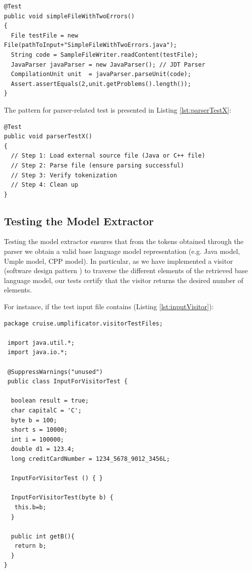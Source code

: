 \begin{lstlisting}[style=java, label={lst:simpleFileWithTwoErrors}, caption=A Parser Test]
@Test
public void simpleFileWithTwoErrors()
{
  File testFile = new File(pathToInput+"SimpleFileWithTwoErrors.java");
  String code = SampleFileWriter.readContent(testFile);
  JavaParser javaParser = new JavaParser(); // JDT Parser
  CompilationUnit unit  = javaParser.parseUnit(code);
  Assert.assertEquals(2,unit.getProblems().length());
}
\end{lstlisting}

The pattern for parser-related test is presented in Listing \ref{lst:parserTestX}:

\begin{lstlisting}[style=java, label={lst:parserTestX}, caption=A pattern for parser tests]
@Test
public void parserTestX()
{
  // Step 1: Load external source file (Java or C++ file)
  // Step 2: Parse file (ensure parsing successful) 
  // Step 3: Verify tokenization
  // Step 4: Clean up
}
\end{lstlisting}

\subsection{Testing the Model Extractor}

Testing the model extractor ensures that from the tokens obtained through the parser we obtain a valid base language model representation (e.g. Java model, Umple model, CPP model). In particular, as we have implemented a visitor (software design pattern \cite{gamma1994design}) to traverse the different elements of the retrieved base language model, our tests certify that the visitor returns the desired number of elements.

For instance, if the test input file contains (Listing \ref{lst:inputVisitor}): 

\begin{lstlisting}[style=java, label={lst:inputVisitor}, caption=Java input file for test]
package cruise.umplificator.visitorTestFiles;

 import java.util.*;
 import java.io.*;

 @SuppressWarnings("unused")
 public class InputForVisitorTest { 

  boolean result = true;
  char capitalC = 'C';
  byte b = 100;
  short s = 10000;
  int i = 100000;
  double d1 = 123.4;
  long creditCardNumber = 1234_5678_9012_3456L;

  InputForVisitorTest () { }

  InputForVisitorTest(byte b) {
   this.b=b;
  }

  public int getB(){
   return b;
  }
}
\end{lstlisting}


